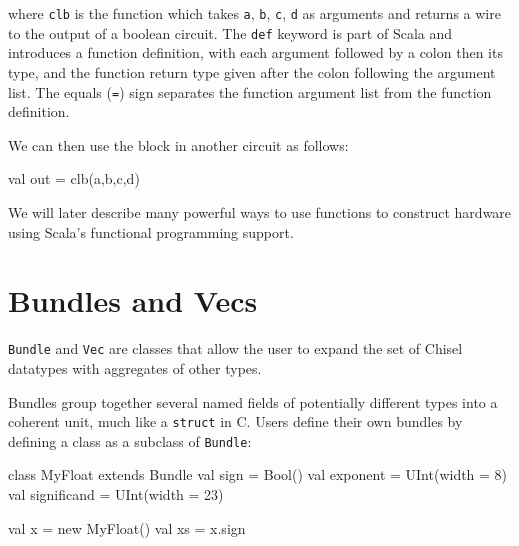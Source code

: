 \documentclass[twocolumn,10pt]{article}
\def\code#1{{\tt #1}}
\begin{document}
\noindent
where \code{clb} is the function which takes \code{a}, \code{b},
\code{c}, \code{d} as arguments and returns a wire to the output of a
boolean circuit.  The \code{def} keyword is part of Scala and
introduces a function definition, with each argument followed by a colon then its type,
and the function return type given after the colon following the
argument list.  The equals (\code{=})
sign separates the function argument list from the function
definition.

We can then use the block in another circuit as follows:
\begin{scala}
val out = clb(a,b,c,d)
\end{scala}






We will later describe many powerful ways to use functions to
construct hardware using Scala's functional programming support.

\section{Bundles and Vecs}

\code{Bundle} and \code{Vec} are classes that allow the user to expand
the set of Chisel datatypes with aggregates of other types.

Bundles group together several named fields of potentially different
types into a coherent unit, much like a \code{struct} in C. Users
define their own bundles by defining a class as a subclass of
\code{Bundle}:
\begin{scala}
class MyFloat extends Bundle {
  val sign        = Bool()
  val exponent    = UInt(width = 8)
  val significand = UInt(width = 23)
}

val x  = new MyFloat()
val xs = x.sign
\end{scala}
\end{document}
